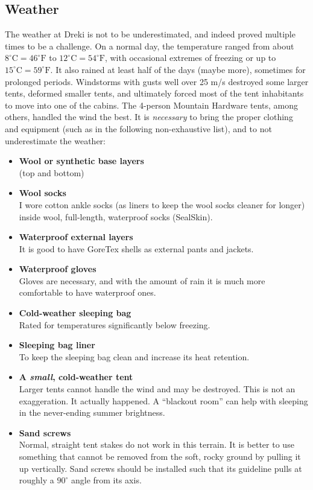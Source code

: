 \subsection{Weather}

The weather at Dreki is not to be underestimated, and indeed proved multiple times to be a challenge.
On a normal day, the temperature ranged from about
$8^\circ \mathrm{C}=46^\circ \mathrm{F}$ to $12^\circ \mathrm{C}=54^\circ \mathrm{F}$,
with occasional extremes of freezing or up to $15^\circ \mathrm{C}=59^\circ \mathrm{F}$.
It also rained at least half of the days (maybe more), sometimes for prolonged periods.
Windstorms with gusts well over 25 m/s destroyed some larger tents, deformed smaller tents,
and ultimately forced most of the tent inhabitants to move into one of the cabins.
The 4-person Mountain Hardware tents, among others, handled the wind the best.
It is \emph{necessary} to bring the proper clothing and equipment
(such as in the following non-exhaustive list), and to not underestimate the weather:
\begin{itemize}
	\item \textbf{Wool or synthetic base layers}\\(top and bottom)
	\item \textbf{Wool socks}\\I wore cotton ankle socks (as liners to keep the wool socks cleaner for longer) inside wool, full-length,
		waterproof socks (SealSkin).
	\item \textbf{Waterproof external layers}\\It is good to have GoreTex shells
		as external pants and jackets.
	\item \textbf{Waterproof gloves}\\Gloves are necessary, and with the amount of rain it is much
		more comfortable to have waterproof ones.
	\item \textbf{Cold-weather sleeping bag}\\Rated for temperatures significantly below freezing.
	\item \textbf{Sleeping bag liner}\\To keep the sleeping bag clean and increase its heat retention.
	\item \textbf{A \emph{small}, cold-weather tent}\\Larger tents cannot handle the wind and may be destroyed. This is not an exaggeration. It actually happened. A ``blackout room'' can help with sleeping in the never-ending summer brightness.
	\item \textbf{Sand screws}\\Normal, straight tent stakes do not work in this terrain. It is better to use something that cannot be removed from the soft, rocky ground by pulling it up vertically. Sand screws should be installed such that its guideline pulls at roughly a $90^\circ$ angle from its axis.
\end{itemize}

